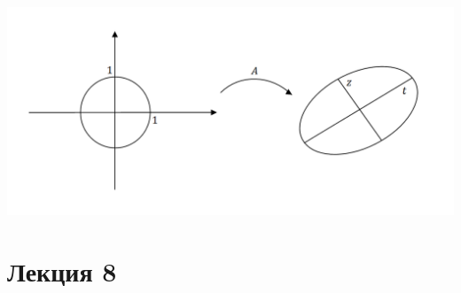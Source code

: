 \documentclass[12pt]{article}
\begin{document}
\begin{enumerate}
\begin{center}
			\includegraphics[scale=0.6]{l7_4.png}
		\end{center}
	\end{enumerate}
	
	
	\newpage
	\section{Лекция 8}
\end{document}

